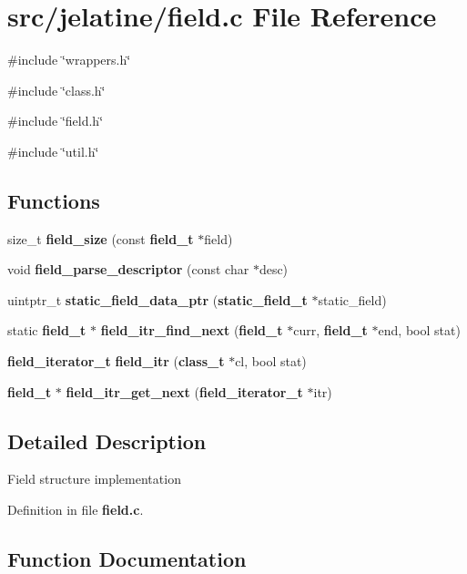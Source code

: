\section{src/jelatine/field.c File Reference}
\label{field_8c}
{\ttfamily \#include \char`\"{}wrappers.h\char`\"{}}\par
{\ttfamily \#include \char`\"{}class.h\char`\"{}}\par
{\ttfamily \#include \char`\"{}field.h\char`\"{}}\par
{\ttfamily \#include \char`\"{}util.h\char`\"{}}\par
\subsection*{Functions}
\begin{DoxyCompactItemize}
\item 
size\_\-t {\bf field\_\-size} (const {\bf field\_\-t} $\ast$field)
\item 
void {\bf field\_\-parse\_\-descriptor} (const char $\ast$desc)
\item 
uintptr\_\-t {\bf static\_\-field\_\-data\_\-ptr} ({\bf static\_\-field\_\-t} $\ast$static\_\-field)
\item 
static {\bf field\_\-t} $\ast$ {\bf field\_\-itr\_\-find\_\-next} ({\bf field\_\-t} $\ast$curr, {\bf field\_\-t} $\ast$end, bool stat)
\item 
{\bf field\_\-iterator\_\-t} {\bf field\_\-itr} ({\bf class\_\-t} $\ast$cl, bool stat)
\item 
{\bf field\_\-t} $\ast$ {\bf field\_\-itr\_\-get\_\-next} ({\bf field\_\-iterator\_\-t} $\ast$itr)
\end{DoxyCompactItemize}


\subsection{Detailed Description}
Field structure implementation 

Definition in file {\bf field.c}.



\subsection{Function Documentation}
